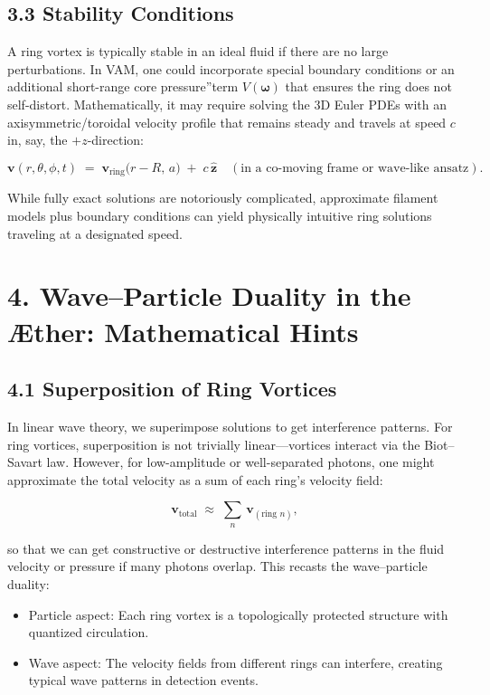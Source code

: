 \subsection*{3.3 Stability Conditions}
A ring vortex is typically stable in an ideal fluid if there are no large perturbations. In VAM, one could incorporate special boundary conditions or an additional short-range \grqq core pressure\textquotedblright term \(V(\boldsymbol{\omega})\) that ensures the ring does not self-distort. Mathematically, it may require solving the 3D Euler PDEs with an axisymmetric/toroidal velocity profile that remains steady and travels at speed \(c\) in, say, the \(+z\)-direction:

\[
 \mathbf{v}(r,\theta,\phi, t) \;=\; \mathbf{v}_\text{ring}\bigl(r - R,\,a\bigr) \;+\; c\,\hat{\mathbf{z}} \quad (\text{in a co-moving frame or wave-like ansatz}).
\]

While fully exact solutions are notoriously complicated, approximate filament models plus boundary conditions can yield physically intuitive ring solutions traveling at a designated speed.

\section*{4. Wave–Particle Duality in the Æther: Mathematical Hints}
\subsection*{4.1 Superposition of Ring Vortices}
In linear wave theory, we superimpose solutions to get interference patterns. For ring vortices, superposition is not trivially linear—vortices interact via the Biot–Savart law. However, for low-amplitude or well-separated photons, one might approximate the total velocity as a sum of each ring's velocity field:

\[
 \mathbf{v}_\text{total} \;\approx\; \sum_{n}\,\mathbf{v}_{(\text{ring } n)},
\]

so that we can get constructive or destructive interference patterns in the fluid velocity or pressure if many photons overlap. This recasts the wave–particle duality:

\begin{itemize}
 \item Particle aspect: Each ring vortex is a topologically protected structure with quantized circulation.
 \item Wave aspect: The velocity fields from different rings can interfere, creating typical wave patterns in detection events.
\end{itemize}


